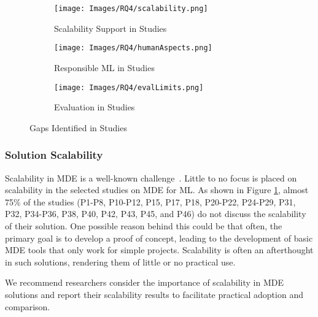 \begin{figure}[htbp]
    \centering
    \begin{subfigure}{0.3\textwidth}
    \texttt{[image: Images/RQ4/scalability.png]}
    \caption{Scalability Support in Studies}
    \label{fig:scalabilityLimits}
    \vspace{-0.8ex}

    \end{subfigure}
\hfill
    \begin{subfigure}{0.3\textwidth}
    \centering
    \texttt{[image: Images/RQ4/humanAspects.png]}
    \caption{Responsible ML in Studies}
    \label{fig:responsibleLimits}
    \vspace{-0.3ex}
\end{subfigure}
\hfill
    \begin{subfigure}{0.3\textwidth}
    \centering
    \texttt{[image: Images/RQ4/evalLimits.png]}
    \caption{Evaluation in Studies}
    \label{fig:evalLimits}
\end{subfigure}
\caption{Gaps Identified in Studies}
\end{figure}



\subsubsection{Solution Scalability}
Scalability in MDE is a well-known challenge~\cite{bucchiarone2020grand, kolovos2013research}. Little to no focus is placed on scalability in the selected studies on MDE for ML. As shown in Figure \ref{fig:scalabilityLimits}, almost 75\% of the studies (P1-P8, P10-P12, P15, P17, P18, P20-P22, P24-P29, P31, P32, P34-P36, P38, P40, P42, P43, P45, and
P46) do not discuss the scalability of their solution. One possible reason behind this could be 
that often, the primary goal is to develop a proof of concept, leading to the development of basic MDE tools that only work for simple projects. Scalability is often an afterthought in such solutions, rendering them of little or no practical use.

We recommend researchers consider the importance of scalability in MDE solutions and report their scalability results to facilitate practical adoption and comparison. %

